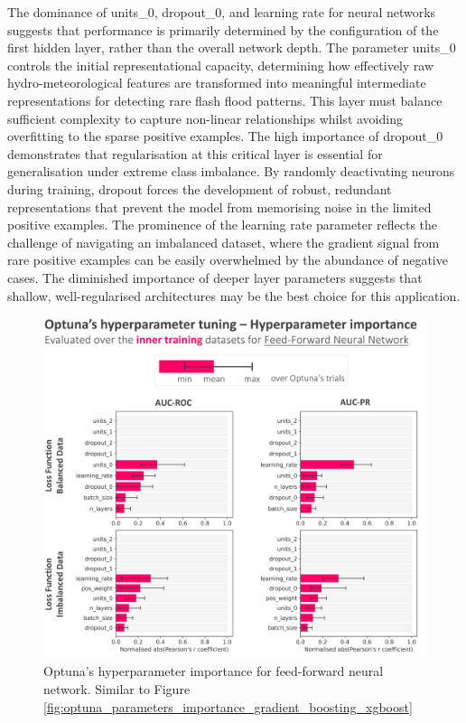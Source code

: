 \documentclass[nhess, manuscript]{copernicus}
\begin{document}
The dominance of units\_0, dropout\_0, and learning rate for neural networks suggests that performance is primarily determined by the configuration of the first hidden layer, rather than the overall network depth. The parameter units\_0 controls the initial representational capacity, determining how effectively raw hydro-meteorological features are transformed into meaningful intermediate representations for detecting rare flash flood patterns. This layer must balance sufficient complexity to capture non-linear relationships whilst avoiding overfitting to the sparse positive examples. The high importance of dropout\_0 demonstrates that regularisation at this critical layer is essential for generalisation under extreme class imbalance. By randomly deactivating neurons during training, dropout forces the development of robust, redundant representations that prevent the model from memorising noise in the limited positive examples. The prominence of the learning rate parameter reflects the challenge of navigating an imbalanced dataset, where the gradient signal from rare positive examples can be easily overwhelmed by the abundance of negative cases. The diminished importance of deeper layer parameters suggests that shallow, well-regularised architectures may be the best choice for this application.

\begin{figure}[t]
\includegraphics[width=12cm]{figures/optuna_parameters_importance_feed_forward_nn.png}
\caption{Optuna's hyperparameter importance for feed-forward neural network. Similar to Figure \ref{fig:optuna_parameters_importance_gradient_boosting_xgboost}}
\label{fig:optuna_parameters_importance_feed_forward_nn}
\end{figure}
\end{document}
